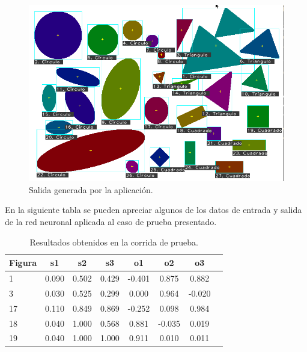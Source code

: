\documentclass[pdftex,a4paper,10.5pt]{article}
\begin{document}
 	           \begin{figure}[H]

	                  \begin{center}
	                    \includegraphics[width=14cm]{salida.png}
	                    \caption{\label{salida_ejemlpo} Salida generada por la aplicaci\'on. }
	                  \end{center}
	            \end{figure}


En la siguiente tabla se pueden apreciar algunos de los datos de entrada y salida de la red neuronal aplicada al caso de prueba presentado.

\begin{table}[ht]
\centering
\begin{tabular}{|l|c|c|c|c|c|c|c|}
  \hline                       
  \textbf{Figura} & \textbf{s1} & \textbf{s2} & \textbf{s3} & \textbf{o1} & \textbf{o2} & \textbf{o3}\\
  \hline
1 & 0.090 & 0.502 & 0.429 & -0.401 & 0.875 & 0.882\\
\hline
3 & 0.030 & 0.525 & 0.299 & 0.000 & 0.964 & -0.020\\
\hline
17 & 0.110 & 0.849 & 0.869 & -0.252 & 0.098 & 0.984\\
\hline
18 & 0.040 & 1.000 & 0.568 & 0.881 & -0.035 & 0.019\\
\hline
19 & 0.040 & 1.000 & 1.000 & 0.911 & 0.010 & 0.011\\

\hline
\end{tabular}	 
\caption{Resultados obtenidos en la corrida de prueba.}
\end{table}
\end{document}
